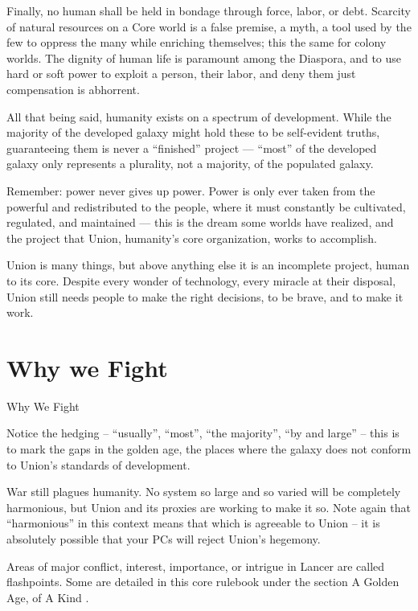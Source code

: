 Finally, no human shall be held in bondage through force, labor, or debt. Scarcity of natural  
resources on a Core world is a false premise, a myth, a tool used by the few to oppress the many  
while enriching themselves; this the same for colony worlds. The dignity of human life is  
paramount among the Diaspora, and to use hard or soft power to exploit a person, their labor,  
and deny them just compensation is abhorrent.  
 

All that being said, humanity exists on a spectrum of development. While the majority of the  
developed galaxy might hold these to be self-evident truths, guaranteeing them is never a  
“finished” project — “most” of the developed galaxy only represents a plurality, not a majority, of  
the populated galaxy. 
 

Remember: power never gives up power. Power is only ever taken from the powerful and  
redistributed to the people, where it must constantly be cultivated, regulated, and maintained —  
this is the dream some worlds have realized, and the project that Union, humanity’s core  
organization, works to accomplish. 
 

Union is many things, but above anything else it is an incomplete project, human to its core.  
Despite every wonder of technology, every miracle at their disposal, Union still needs people to  
make the right decisions, to be brave, and to make it work. 
 
\section{Why we Fight}
Why We Fight  

Notice the hedging -- “usually”, “most”, “the majority”, “by and large” -- this is to mark the gaps  
in the golden age, the places where the galaxy does not conform to Union’s standards of  
development.
 

                                                                                                           


War still plagues humanity. No system so large and so varied will be completely harmonious, but  
Union and its proxies are working to make it so. Note again that “harmonious” in this context  
means that which is agreeable to Union -- it is absolutely possible that your PCs will reject  
Union’s hegemony.  
 

Areas of major conflict, interest, importance, or intrigue in Lancer are called flashpoints. Some  
are detailed in this core rulebook under the section A Golden Age, of A Kind . 
 

